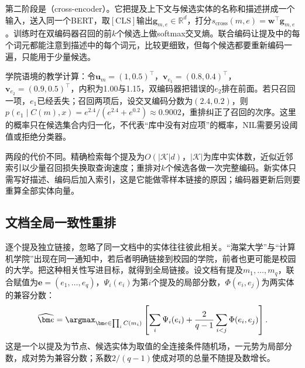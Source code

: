 第二阶段是（cross-encoder）。它把提及上下文与候选实体的名称和描述拼成一个输入，送入同一个BERT，取$[\mathrm{CLS}]$输出$\bm g_{m,e}\in\mathbb R^{d}$，打分$s_{\mathrm{cross}}(m,e)=\bm w^{\top}\bm g_{m,e}$。训练时在双编码器召回的前$k$个候选上做softmax交叉熵。联合编码让提及中的每个词元都能注意到描述中的每个词元，比较更细致，但每个候选都要重新编码一遍，只能用于少量候选。

学院语境的教学计算：令$\bm u_m=(1,0.5)^\top$，$\bm v_{e_1}=(0.8,0.4)^\top$，$\bm v_{e_2}=(0.9,0.5)^\top$，内积为1.00与1.15，双编码器把错误的$e_2$排在前面。若只召回一项，$e_1$已经丢失；召回两项后，设交叉编码分数为$(2.4,0.2)$，则$p(e_1\mid C(m),x)=e^{2.4}/(e^{2.4}+e^{0.2})\approx0.9002$，重排纠正了召回的次序。这里的概率只在候选集合内归一化，不代表“库中没有对应项”的概率，NIL需要另设阈值或拒绝分类器。

两段的代价不同。精确检索每个提及为$O(|\mathcal K|d)$，$|\mathcal K|$为库中实体数，近似近邻索引以少量召回损失换取查询速度；重排对$k$个候选各做一次完整编码。新实体只需写好描述、编码后加入索引，这是它能做零样本链接的原因；编码器更新后则要重算全部实体向量。

\subsection{文档全局一致性重排}
\label{sec:nlp-extraction-global-linking}

逐个提及独立链接，忽略了同一文档中的实体往往彼此相关。“海棠大学”与“计算机学院”出现在同一通知中，若后者明确链接到校园的学院，前者也更可能是校园的大学。把这种相关性写进目标，就得到全局链接。设文档有提及$m_1,\ldots,m_q$，联合赋值为$\bm e=(e_1,\ldots,e_q)$，$\Psi_i(e_i)$为第$i$个提及的局部分数，$\Phi(e_i,e_j)$为两实体的兼容分数：
\begin{equation}
  \widehat{\bm e}=\argmax_{\bm e\in\prod_i C(m_i)}
  \left[\sum_{i}\Psi_i(e_i)+
  \frac{2}{q-1}\sum_{i<j}\Phi(e_i,e_j)\right].
  \label{eq:nlp-extraction-global-linking}
\end{equation}
这是一个以提及为节点、候选实体为取值的全连接条件随机场，一元势为局部分数，成对势为兼容分数；系数$2/(q-1)$使成对项的总量不随提及数增长。

